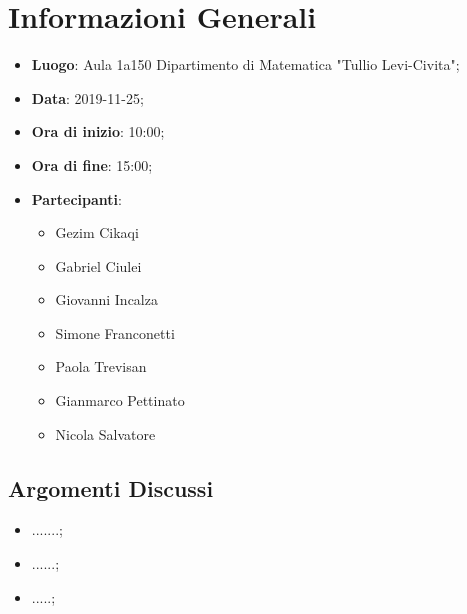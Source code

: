 \section{Informazioni Generali}
	\begin{itemize}
		\item \textbf {Luogo}: Aula 1a150 Dipartimento di Matematica "Tullio Levi-Civita";
		\item \textbf {Data}: 2019-11-25;
		\item \textbf {Ora di inizio}: 10:00;
		\item \textbf {Ora di fine}: 15:00;
		\item \textbf {Partecipanti}: 
			\begin{itemize}
				\item Gezim Cikaqi
				\item Gabriel Ciulei
				\item Giovanni Incalza
				\item Simone Franconetti
				\item Paola Trevisan
				\item Gianmarco Pettinato
				\item Nicola Salvatore
			\end{itemize}
	\end{itemize}
\subsection{Argomenti Discussi}
	\begin{itemize}
		\item .......;
		\item ......;
		\item .....;
		
	\end{itemize}